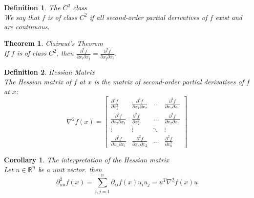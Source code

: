 \documentclass[11pt]{book} %
\newtheorem{theorem}{Theorem}[section]
\newtheorem{definition}{Definition}[section]
\newtheorem*{corollary*}{Corollary}
\begin{document}
\bigbreak

\begin{definition}{The $C^2$ class} \\
We say that $f$ is of class $C^2$ if all second-order partial derivatives of $f$ exist and are continuous.
\end{definition}

\bigbreak

\begin{theorem}{Clairaut's Theorem} \\
If $f$ is of class $C^2$, then $\frac{\partial^2 f}{\partial x_i \partial x_j} = \frac{\partial^2 f}{\partial x_j \partial x_i}$.
\end{theorem}

\bigbreak

\begin{definition}{Hessian Matrix} \\
The Hessian matrix of $f$ at $x$ is the matrix of second-order partial derivatives of $f$ at $x$:
\begin{equation}
    \nabla^2 f(x) = \begin{bmatrix}
    \frac{\partial^2 f}{\partial x_1^2} & \frac{\partial^2 f}{\partial x_1 \partial x_2} & \ldots & \frac{\partial^2 f}{\partial x_1 \partial x_n} \\
    \frac{\partial^2 f}{\partial x_2 \partial x_1} & \frac{\partial^2 f}{\partial x_2^2} & \ldots & \frac{\partial^2 f}{\partial x_2 \partial x_n} \\
    \vdots & \vdots & \ddots & \vdots \\
    \frac{\partial^2 f}{\partial x_n \partial x_1} & \frac{\partial^2 f}{\partial x_n \partial x_2} & \ldots & \frac{\partial^2 f}{\partial x_n^2}
    \end{bmatrix}
\end{equation}
\end{definition}

\bigbreak

\begin{corollary*}{The interpretation of the Hessian matrix} \\
Let $u \in \mathbb{R}^n$ be a unit vector. then
\begin{equation}
    \partial_{uu}^2 f(x) = \sum_{i,j=1}^n \partial_{ij} f(x) u_i u_j  = u^T \nabla^2 f(x) u
\end{equation}
\end{corollary*}

\bigbreak
\end{document}
